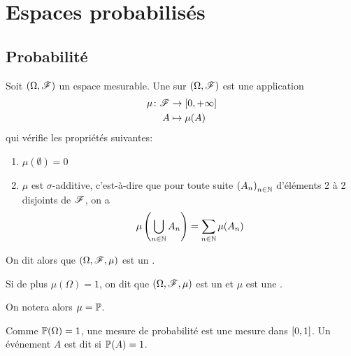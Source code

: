 \section{Espaces probabilisés}\label{subsec:1}

\subsection{Probabilité}\label{subsubsec:1-1}

\begin{definition}
    Soit \((\Omega, \mathscr{F})\) un espace mesurable. Une
     sur \((\Omega, \mathscr{F})\) est une application
    \begin{equation*}
        \begin{aligned}
            \mu\colon \mathscr{F} &\to \mathopen{}\left[0,+\infty\right]\mathclose{}\\
            A &\mapsto \mu(A)
        \end{aligned}
    \end{equation*}
    qui vérifie les propriétés suivantes:
    \begin{enumerate}
        \item \(\mu(\emptyset) = 0\)
        \item \(\mu\) est \(\sigma\)-additive, c'est-à-dire que pour
        toute suite \({(A_n)}_{n\in\mathbb{N}}\) d'éléments 2 à 2
        disjoints de \(\mathscr{F}\), on a
        \begin{equation*}
            \mu\left(\bigcup_{n\in\mathbb{N}}A_n\right) = \sum_{n\in\mathbb{N}}\mu(A_n)
        \end{equation*}
    \end{enumerate}

    On dit alors que \((\Omega, \mathscr{F},\mu)\) est un .

    Si de plus \(\mu(\Omega) = 1\), on dit que \((\Omega, \mathscr{F},\mu)\)
    est un  et \(\mu\) est une .

    On notera alors \(\mu = \mathbb{P}\).
\end{definition}

\begin{remark}
    Comme \(\mathbb{P}(\Omega)=1\), une mesure de probabilité est une mesure
    dans \(\mathopen{}\left[0,1\right]\mathclose{}\). Un événement \(A\) est dit 
    si \(\mathbb{P}(A) = 1\).
\end{remark}

